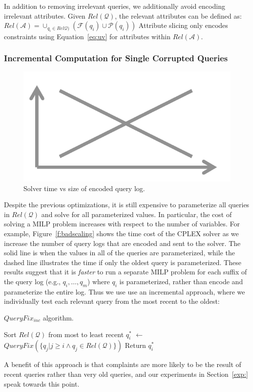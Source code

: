 In addition to removing irrelevant queries, we additionally avoid encoding irrelevant attributes.
Given $Rel\mathcal{(Q)}$, the relevant attributes can be defined as:
$Rel\mathcal{(A)} = \cup_{q_i \in Rel\mathcal{Q)}} (\mathcal{F}(q_i)\cup \mathcal{P}(q_i))$
Attribute slicing only encodes constraints using Equation~\ref{eq:uv} for attributes within $Rel\mathcal{(A)}$.






\subsubsection{Incremental Computation for Single Corrupted Queries}

\begin{figure}[t]
  \centering
  \includegraphics[width=.4\textwidth]{figures/placeholder}
  \caption{Solver time vs size of encoded query log.}
  \label{fig:badscaling}
\end{figure}


Despite the previous optimizations, it is still expensive to parameterize all 
queries in $Rel\mathcal{(Q)}$ and solve for all parameterized values.
In particular, the cost of solving a MILP problem increases 
with respect to the number of variables.
For example, Figure~\ref{f:badscaling} shows the time cost of the CPLEX solver
as we increase the number of query logs that are encoded and sent to the solver.  
The solid line is when the values in all of the queries are parameterized, while
the dashed line illustrates the time if only the oldest query is parameterized. 
These results suggest that it is {\it faster} to run a separate MILP problem for each 
suffix of the query log (e.g., $q_i, \ldots, q_m$) where $q_i$ is parameterized, 
rather than encode and parameterize the entire log.
Thus we use use an incremental approach, where we individually test each relevant query from the most recent
to the oldest:


\begin{algorithm}[htbp]
\caption{$QueryFix_{inc}$ algorithm.}
\label{alg:incalg}
\begin{algorithmic}
\STATE Sort $Rel\mathcal{(Q)}$ from most to least recent
  \STATE $q_i^*$ $\leftarrow$ $QueryFix(\{q_j | j \ge i \wedge q_j \in Rel\mathcal{(Q)}\})$
    \STATE Return $q_i^*$
  \ENDIF
\ENDFOR
\end{algorithmic}
\end{algorithm}



A benefit of this approach is that complaints are more likely to be the result of
recent queries rather than very old queries, and our experiments in Section~\ref{exp:}
speak towards this point.





